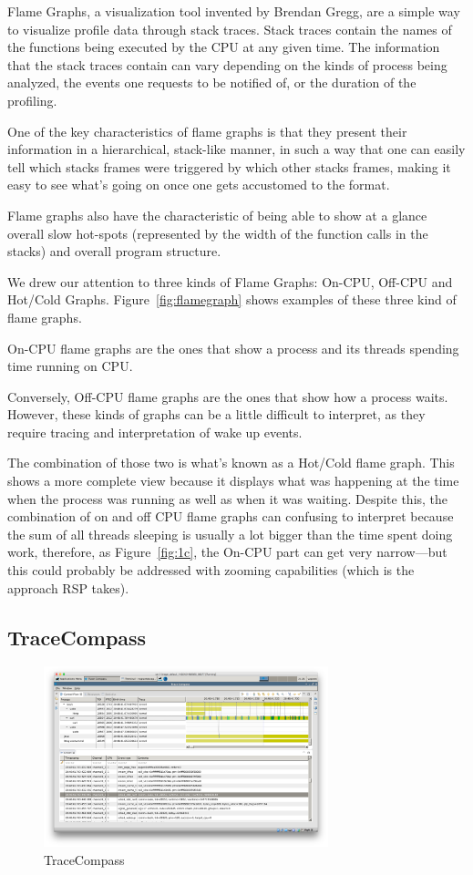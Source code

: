 \documentclass[10pt]{article}
\begin{document}
Flame Graphs, a visualization tool invented by Brendan Gregg, are a simple way to
visualize profile data through stack traces. Stack traces contain the names of
the functions being executed by the CPU at any given time. The information that
the stack traces contain can vary depending on the kinds of process being
analyzed, the events one requests to be notified of, or the duration of the
profiling.

One of the key characteristics of flame graphs is that they present their
information in a hierarchical, stack-like manner, in such a way that one can
easily tell which stacks frames were triggered by which other stacks frames,
making it easy to see what's going on once one gets accustomed to the format.

Flame graphs also have the characteristic of being able to show at a glance
overall slow hot-spots (represented by the width of the function calls in the
stacks) and overall program structure.

We drew our attention to three kinds of Flame Graphs: On-CPU, Off-CPU and
Hot/Cold Graphs. Figure~\ref{fig:flamegraph} shows examples of these three 
kind of flame graphs.

On-CPU flame graphs are the ones that show a process and its threads spending
time running on CPU.

Conversely, Off-CPU flame graphs are the ones that show how a process waits.
However, these kinds of graphs can be a little difficult to interpret, as they
require tracing and interpretation of wake up events.

The combination of those two is what's known as a Hot/Cold flame graph. This
shows a more complete view because it displays what was happening at the time
when the process was running as well as when it was waiting. Despite this, the
combination of on and off CPU flame graphs can confusing to interpret because
the sum of all threads sleeping is usually a lot bigger than the time spent
doing work, therefore, as Figure~\ref{fig:1c}, the On-CPU part can get very
narrow---but this could probably be addressed with zooming capabilities (which
is the approach RSP takes).

\subsection{TraceCompass}

\begin{figure}[h]
\includegraphics[width=3.25in]{images/tracecompass}
\caption{TraceCompass}
\label{fig:traceCompass}
\end{figure}
\end{document}
